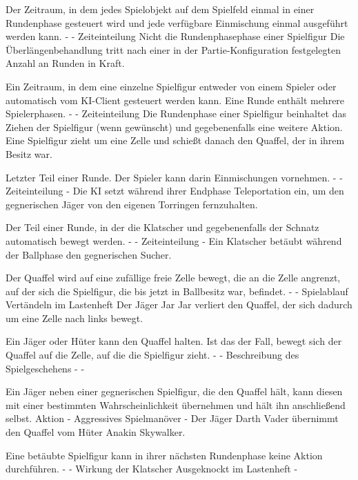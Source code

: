 {Der Zeitraum, in dem jedes Spielobjekt auf dem Spielfeld einmal in einer Rundenphase gesteuert wird und jede verfügbare Einmischung einmal ausgeführt werden kann.}
{-}
{-}
{Zeiteinteilung}
{Nicht die Rundenphasephase einer Spielfigur}
{Die Überlängenbehandlung tritt nach einer in der Partie-Konfiguration festgelegten Anzahl an Runden in Kraft.}

{Ein Zeitraum, in dem eine einzelne Spielfigur entweder von einem Spieler oder automatisch vom KI-Client gesteuert werden kann. Eine Runde enthält mehrere Spielerphasen.}
{-}
{-}
{Zeiteinteilung}
{Die Rundenphase einer Spielfigur beinhaltet das Ziehen der Spielfigur (wenn gewünscht) und gegebenenfalls eine weitere Aktion.}
{Eine Spielfigur zieht um eine Zelle und schießt danach den Quaffel, der in ihrem Besitz war.}

{Letzter Teil einer Runde. Der Spieler kann darin Einmischungen vornehmen.}
{-}
{-}
{Zeiteinteilung}
{-}
{Die KI setzt während ihrer Endphase Teleportation ein, um den gegnerischen Jäger von den eigenen Torringen fernzuhalten.}

{Der Teil einer Runde, in der die Klatscher und gegebenenfalls der Schnatz automatisch bewegt werden.}
{-}
{-}
{Zeiteinteilung}
{-}
{Ein Klatscher betäubt während der Ballphase den gegnerischen Sucher.}

{Der Quaffel wird auf eine zufällige freie Zelle bewegt, die an die Zelle angrenzt, auf der sich die Spielfigur, die bis jetzt in Ballbesitz war, befindet.}
{-}
{-}
{Spielablauf}
{\glqq{}Vertändeln\grqq{}  im Lastenheft}
{Der Jäger \glqq{}Jar Jar\grqq{} verliert den Quaffel, der sich dadurch um eine Zelle nach links bewegt.}

{Ein Jäger oder Hüter kann den Quaffel halten. Ist das der Fall, bewegt sich der Quaffel auf die Zelle, auf die die Spielfigur zieht.}
{-}
{-}
{Beschreibung des Spielgeschehens}
{-}
{-}

{Ein Jäger neben einer gegnerischen Spielfigur, die den Quaffel hält, kann diesen mit einer bestimmten Wahrscheinlichkeit übernehmen und hält ihn anschließend selbst.}
{Aktion}
{-}
{Aggressives Spielmanöver}
{-}
{Der Jäger \glqq{}Darth Vader\grqq{} übernimmt den Quaffel vom Hüter \glqq{}Anakin Skywalker\grqq{}.}

{Eine betäubte Spielfigur kann in ihrer nächsten Rundenphase keine Aktion durchführen.}
{-}
{-}
{Wirkung der Klatscher}
{\glqq{}Ausgeknockt\grqq{}  im Lastenheft}
{-}

